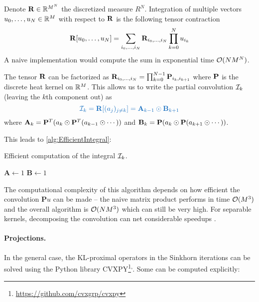 \documentclass[../report.tex]{subfiles}
\begin{document}
Denote $\mathbf{R} \in \mathbb{R}^{M^N}$ the discretized measure $R^N$. Integration of multiple vectors $u_0,\ldots,u_N\in\mathbb{R}^M$ with respect to $\mathbf{R}$ is the following tensor contraction
\[
	\mathbf{R}[u_0,\ldots,u_N] =
	\sum_{i_0,\ldots,i_N} \mathbf{R}_{i_0,\ldots,i_N}\prod_{k=0}^N u_{i_k}
\]
A naive implementation would compute the sum in exponential time $\mathcal{O}(NM^N)$.

\begin{prop}
The tensor $\mathbf{R}$ can be factorized as $\mathbf{R}_{i_0,\ldots,i_N} = \prod_{k=0}^{N-1} \mathbf{P}_{i_k,i_{k+1}}$ where $\mathbf{P}$ is the discrete heat kernel on $\mathbb{R}^M$. This allows us to write the partial convolution $\mathcal{I}_k$ (leaving the $k$th component out) as
\begin{equation}
{\bluefont
	\calI_k = \bfR[(a_j)_{j\neq k}] =
	\mathbf{A}_{k-1} \odot \mathbf{B}_{k+1}
}
\end{equation}
where $\mathbf{A}_{k} = \mathbf{P}^T (a_k \odot \mathbf{P}^T(a_{k-1} \odot \cdots))$ and $\mathbf{B}_k = \mathbf{P} (a_k \odot \mathbf{P} (a_{k+1}\odot \cdots))$.
\end{prop}

This leads to \cref{alg:EfficientIntegral}:
\begin{algorithm}
\caption{Efficient computation of the integral $\mathcal{I}_k$.}\label{alg:EfficientIntegral}
$\mathbf{A} \leftarrow 1$\;
$\mathbf{B} \leftarrow 1$\;
\;
\end{algorithm}

The computational complexity of this algorithm depends on how efficient the convolution $\mathbf{P}u$ can be made -- the naive matrix product performs in time $\mathcal{O}(M^3)$ and the overall algorithm is $\mathcal{O}(NM^3)$ which can still be very high. For separable kernels, decomposing the convolution can net considerable speedups \parencite[p.~74]{peyr2018computational}.

\paragraph{Projections.}
In the general case, the KL-proximal operators in the Sinkhorn iterations can be solved using the Python library CVXPY\footnote{\url{https://github.com/cvxgrp/cvxpy}}\textsuperscript{,}. Some can be computed explicitly:
\end{document}
